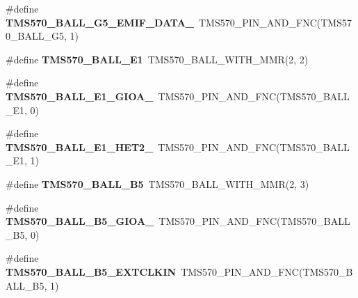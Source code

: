 \begin{DoxyCompactItemize}
\item 
\mbox{\label{tms570ls3137zwt-pins_8h_a12f9cb4ee278df2edb09ba0f9f39b942}} 
\#define {\bfseries T\+M\+S570\+\_\+\+B\+A\+L\+L\+\_\+\+G5\+\_\+\+E\+M\+I\+F\+\_\+\+D\+A\+T\+A\+\_}~T\+M\+S570\+\_\+\+P\+I\+N\+\_\+\+A\+N\+D\+\_\+\+F\+NC(T\+M\+S570\+\_\+\+B\+A\+L\+L\+\_\+\+G5, 1)
\item 
\mbox{\label{tms570ls3137zwt-pins_8h_a8759bcc00d8f368d9f69181fad373633}} 
\#define {\bfseries T\+M\+S570\+\_\+\+B\+A\+L\+L\+\_\+\+E1}~T\+M\+S570\+\_\+\+B\+A\+L\+L\+\_\+\+W\+I\+T\+H\+\_\+\+M\+MR(2, 2)
\item 
\mbox{\label{tms570ls3137zwt-pins_8h_a5c549b0fcef56ac3fc148efc117294be}} 
\#define {\bfseries T\+M\+S570\+\_\+\+B\+A\+L\+L\+\_\+\+E1\+\_\+\+G\+I\+O\+A\+\_}~T\+M\+S570\+\_\+\+P\+I\+N\+\_\+\+A\+N\+D\+\_\+\+F\+NC(T\+M\+S570\+\_\+\+B\+A\+L\+L\+\_\+\+E1, 0)
\item 
\mbox{\label{tms570ls3137zwt-pins_8h_a76539c937eb37aaec3dd015916ebb1c3}} 
\#define {\bfseries T\+M\+S570\+\_\+\+B\+A\+L\+L\+\_\+\+E1\+\_\+\+H\+E\+T2\+\_}~T\+M\+S570\+\_\+\+P\+I\+N\+\_\+\+A\+N\+D\+\_\+\+F\+NC(T\+M\+S570\+\_\+\+B\+A\+L\+L\+\_\+\+E1, 1)
\item 
\mbox{\label{tms570ls3137zwt-pins_8h_a56ff86ba1c80fd2bbbeead966feb9839}} 
\#define {\bfseries T\+M\+S570\+\_\+\+B\+A\+L\+L\+\_\+\+B5}~T\+M\+S570\+\_\+\+B\+A\+L\+L\+\_\+\+W\+I\+T\+H\+\_\+\+M\+MR(2, 3)
\item 
\mbox{\label{tms570ls3137zwt-pins_8h_a895c18f5a096d39a08d32257d169bcb4}} 
\#define {\bfseries T\+M\+S570\+\_\+\+B\+A\+L\+L\+\_\+\+B5\+\_\+\+G\+I\+O\+A\+\_}~T\+M\+S570\+\_\+\+P\+I\+N\+\_\+\+A\+N\+D\+\_\+\+F\+NC(T\+M\+S570\+\_\+\+B\+A\+L\+L\+\_\+\+B5, 0)
\item 
\mbox{\label{tms570ls3137zwt-pins_8h_a10e21eccc3572e6f06dc387d46f86fc7}} 
\#define {\bfseries T\+M\+S570\+\_\+\+B\+A\+L\+L\+\_\+\+B5\+\_\+\+E\+X\+T\+C\+L\+K\+IN}~T\+M\+S570\+\_\+\+P\+I\+N\+\_\+\+A\+N\+D\+\_\+\+F\+NC(T\+M\+S570\+\_\+\+B\+A\+L\+L\+\_\+\+B5, 1)
\item 
\mbox{\label{tms570ls3137zwt-pins_8h_a70d2ed5d9f0efadd3ac7497498dc0df9}} 

\end{DoxyCompactItemize}
